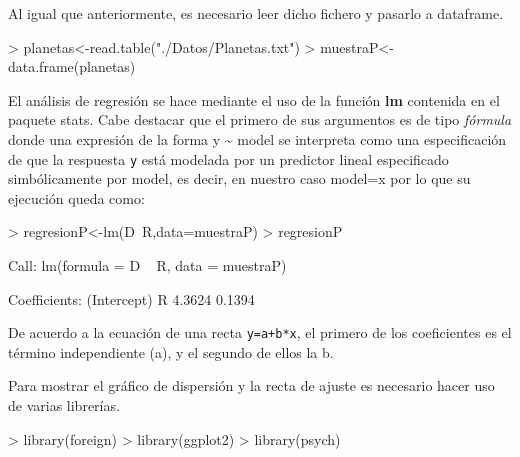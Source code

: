 \documentclass [a4paper] {article}
\begin{document}
Al igual que anteriormente, es necesario leer dicho fichero y pasarlo a dataframe.
\begin{Schunk}
\begin{Sinput}
> planetas<-read.table("./Datos/Planetas.txt")
> muestraP<-data.frame(planetas)
\end{Sinput}
\end{Schunk}

\bigskip
El análisis de regresión se hace mediante el uso de la función \textbf{lm} contenida en el paquete stats. Cabe destacar que el primero
de sus argumentos es de tipo \textit{fórmula} donde una expresión de la forma y \textasciitilde{} model se interpreta como una especificación de que 
la respuesta \texttt{y} está modelada por un predictor lineal especificado simbólicamente por model, es decir, en nuestro caso model=x por lo que
su ejecución queda como:
\begin{Schunk}
\begin{Sinput}
> regresionP<-lm(D~R,data=muestraP)
> regresionP
\end{Sinput}
\begin{Soutput}
Call:
lm(formula = D ~ R, data = muestraP)

Coefficients:
(Intercept)            R  
     4.3624       0.1394  
\end{Soutput}
\end{Schunk}

\bigskip
De acuerdo a la ecuación de una recta \texttt{y=a+b*x}, el primero de los coeficientes es el término independiente (a), y el segundo
de ellos la b.

\bigskip
Para mostrar el gráfico de dispersión y la recta de ajuste es necesario hacer uso de varias librerías.
\begin{Schunk}
\begin{Sinput}
> library(foreign)
> library(ggplot2)
> library(psych)
\end{Sinput}
\end{Schunk}
\end{document}
